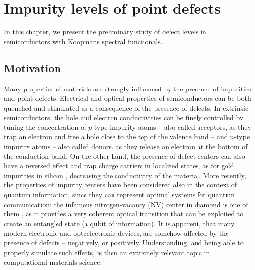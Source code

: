 \cleardoublepage
\chapter{Impurity levels of point defects\label{ch:defects}}
In this chapter, we present the preliminary study of defect levels in semiconductors with Koopmans spectral functionals. 

\clearpage
\section{Motivation}
Many properties of materials are strongly influenced by the presence of impurities and point defects. Electrical and optical properties of semiconductors can be both quenched and stimulated as a consequence of the presence of defects. In extrinsic semiconductors, the hole and electron conductivities can be finely controlled by tuning the concentration of $p$-type impurity atoms -- also called acceptors, as they trap an electron and free a hole close to the top of the valence band -- and $n$-type impurity atoms -- also called donors, as they release an electron at the bottom of the conduction band. On the other hand, the presence of defect centers can also have a reversed effect and trap charge carriers in localized states, as for gold impurities in silicon \cite{corsetti_negative-u_2014}, decreasing the conductivity of the material. More recently, the properties of impurity centers have been considered also in the context of quantum information, since they can represent optimal systems for quantum communication: the infamous nitrogen-vacancy (NV) center in diamond is one of them \cite{maze_properties_2011}, as it provides a very coherent optical transition that can be exploited to create an entangled state (a qubit of information). It is apparent, that many modern electronic and optoelectronic devices, are somehow affected by the presence of defects -- negatively, or positively. Understanding, and being able to properly simulate such effects, is then an extremely relevant topic in computational materials science.


